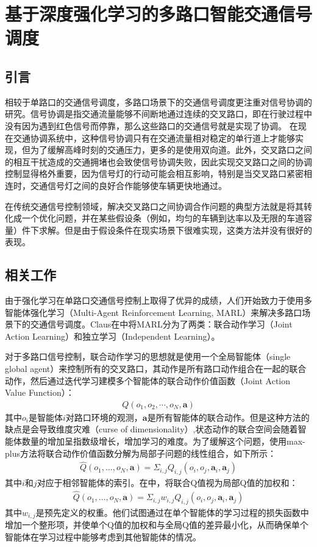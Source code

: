 
\chapter{基于深度强化学习的多路口智能交通信号调度}
\section{引言}
相较于单路口的交通信号调度，多路口场景下的交通信号调度更注重对信号协调的研究。信号协调是指交通流量能够不间断地通过连续的交叉路口，即在行驶过程中没有因为遇到红色信号而停靠，那么这些路口的交通信号就是实现了协调。
在现在交通协调系统中，这种信号协调只有在交通流量相对稳定的单行道上才能够实现，但为了缓解高峰时刻的交通压力，更多的是使用双向道。此外，交叉路口之间的相互干扰造成的交通拥堵也会致使信号协调失败，因此实现交叉路口之间的协调控制显得格外重要，因为信号灯的行动可能会相互影响，特别是当交叉路口紧密相连时，交通信号灯之间的良好合作能够使车辆更快地通过。

在传统交通信号控制领域，解决交叉路口之间协调合作问题的典型方法就是将其转化成一个优化问题，并在某些假设条（例如，均匀的车辆到达率\cite{roess2004traffic,webster1958traffic}以及无限的车道容量\cite{}）件下求解。但是由于假设条件在现实场景下很难实现，这类方法并没有很好的表现。

\section{相关工作}
由于强化学习在单路口交通信号控制上取得了优异的成绩，人们开始致力于使用多智能体强化学习（Multi-Agent Reinforcement Learning, MARL）来解决多路口场景下的交通信号调度。Claus在中将MARL分为了两类：联合动作学习（Joint Action Learning）和独立学习（Independent Learning）。

对于多路口信号控制，联合动作学习的思想就是使用一个全局智能体（single global agent）来控制所有的交叉路口，其动作是所有路口动作组合在一起的联合动作，然后通过迭代学习建模多个智能体的联合动作价值函数（Joint Action Value Function）：
\begin{align}
  Q(o_1, o_2, \cdots, o_N, \mathbf{a})
\end{align}
其中$o_i$是智能体$i$对路口环境的观测，$\mathbf{a}$是所有智能体的联合动作。但是这种方法的缺点是会导致维度灾难（curse of dimensionality）,状态动作的联合空间会随着智能体数量的增加呈指数级增长，增加学习的难度。为了缓解这个问题，使用max-plus方法将联合动作价值函数分解为局部子问题的线性组合，如下所示：
\begin{align}
  \hat{Q}\left(o_{1}, \ldots, o_{N}, \mathbf{a}\right)=\Sigma_{i, j} Q_{i, j}\left(o_{i}, o_{j}, \mathbf{a}_{i}, \mathbf{a}_{j}\right)
\end{align}
其中$i \text{和} j$对应于相邻智能体的索引。在中，将联合Q值视为局部Q值的加权和：
\begin{align}
  \hat{Q}\left(o_{1}, \ldots, o_{N}, \mathbf{a}\right)=\Sigma_{i, j} w_{i, j} Q_{i, j}\left(o_{i}, o_{j}, \mathbf{a}_{i}, \mathbf{a}_{j}\right)
\end{align}
其中$w_{i,j}$是预先定义的权重。他们试图通过在单个智能体的学习过程的损失函数中增加一个整形项，并使单个Q值的加权和与全局Q值的差异最小化，从而确保单个智能体在学习过程中能够考虑到其他智能体的情况。

